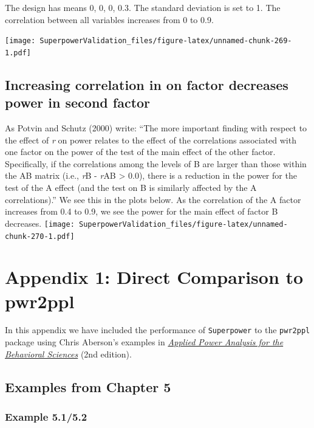\documentclass[]{book}
\begin{document}
The design has means 0, 0, 0, 0.3. The standard deviation is set to 1. The correlation between all variables increases from 0 to 0.9.

\texttt{[image: SuperpowerValidation\_files/figure-latex/unnamed-chunk-269-1.pdf]}

\hypertarget{increasing-correlation-in-on-factor-decreases-power-in-second-factor}{%
\section{Increasing correlation in on factor decreases power in second factor}\label{increasing-correlation-in-on-factor-decreases-power-in-second-factor}}

As Potvin and Schutz (2000) write: ``The more important finding with respect to the effect of \emph{r} on power relates to the effect of the correlations associated with one factor on the power of the test of the main effect of the other factor. Specifically, if the correlations among the levels of B are larger than those within the AB matrix (i.e., \emph{r}B - \emph{r}AB \textgreater{} 0.0), there is a reduction in the power for the test of the A effect (and the test on B is similarly affected by the A correlations).''
We see this in the plots below. As the correlation of the A factor increases from 0.4 to 0.9, we see the power for the main effect of factor B decreases.
\texttt{[image: SuperpowerValidation\_files/figure-latex/unnamed-chunk-270-1.pdf]}

\hypertarget{appendix-1-direct-comparison-to-pwr2ppl}{%
\chapter{Appendix 1: Direct Comparison to pwr2ppl}\label{appendix-1-direct-comparison-to-pwr2ppl}}

In this appendix we have included the performance of \texttt{Superpower} to the \texttt{pwr2ppl} package using Chris Aberson's examples in \href{https://www.crcpress.com/Applied-Power-Analysis-for-the-Behavioral-Sciences-2nd-Edition/Aberson/p/book/9781138044593}{\emph{Applied Power Analysis for the Behavioral Sciences}} (2nd edition).

\hypertarget{examples-from-chapter-5}{%
\section{Examples from Chapter 5}\label{examples-from-chapter-5}}

\hypertarget{example-5.15.2}{%
\subsection{Example 5.1/5.2}\label{example-5.15.2}}
\end{document}
